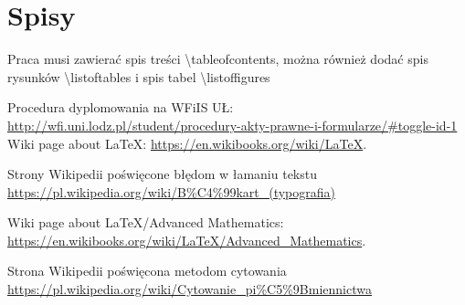 \documentclass{wfiisul}
\begin{document}
\section{Spisy}
Praca musi zawierać spis treści {\textbackslash}tableofcontents, można również dodać spis rysunków  {\textbackslash}listoftables i spis tabel 
{\textbackslash}listoffigures

\clearpage
\tableofcontents
\listoftables
\listoffigures

 Procedura dyplomowania na WFiIS UŁ:
\url{http://wfi.uni.lodz.pl/student/procedury-akty-prawne-i-formularze/#toggle-id-1}
 Wiki page about LaTeX: \url{https://en.wikibooks.org/wiki/LaTeX}.

 Strony Wikipedii poświęcone błędom w łamaniu tekstu\\
\url{https://pl.wikipedia.org/wiki/B%C4%99kart_(typografia)}

 Wiki page about LaTeX/Advanced Mathematics: \url{https://en.wikibooks.org/wiki/LaTeX/Advanced_Mathematics}.

 Strona Wikipedii poświęcona metodom cytowania \\
\url{https://pl.wikipedia.org/wiki/Cytowanie_pi%C5%9Bmiennictwa}
\end{document}
